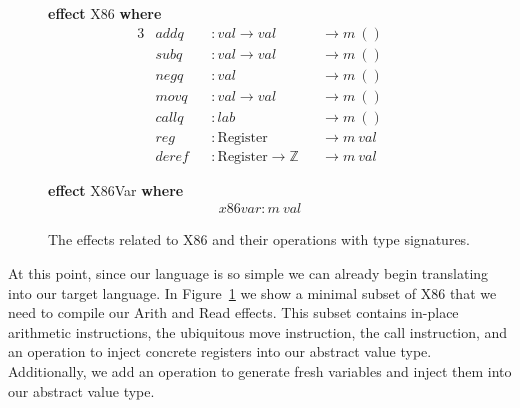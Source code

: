 \documentclass[a4paper,UKenglish,cleveref, autoref, thm-restate]{oasics-v2021}
\begin{document}
\begin{figure}[ht]
  \begin{minipage}[t]{0.4\textwidth}
  \textbf{effect} X86 \textbf{where}
  \vspace{-1em}
  \begin{alignat*}{3}
    & \mathit{addq}  && : \mathit{val} \to \mathit{val} && \to m~() \\
    & \mathit{subq}  && : \mathit{val} \to \mathit{val} && \to m~() \\
    & \mathit{negq}  && : \mathit{val}                  && \to m~() \\
    & \mathit{movq}  && : \mathit{val} \to \mathit{val} && \to m~() \\
    & \mathit{callq} && : \mathit{lab}                  && \to m~() \\
    & \mathit{reg}   && : \mathrm{Register}             && \to m~\mathit{val} \\
    & \mathit{deref} && : \mathrm{Register} \to \mathit{\mathbb{Z}} && \to m~\mathit{val}
  \end{alignat*}
  \end{minipage}
  \begin{minipage}[t]{0.4\textwidth}
  \textbf{effect} X86Var \textbf{where}
  \vspace{-1em}
  \begin{align*}
    \mathit{x86var} : m~\mathit{val}
  \end{align*}
  \end{minipage}
  \caption{The effects related to X86 and their operations with type signatures.}\label{fig:x86-ops}
\end{figure}

At this point, since our language is so simple we can already begin translating into our target language.
In Figure~\ref{fig:x86-ops} we show a minimal subset of X86 that we need to compile our Arith and Read effects.
This subset contains in-place arithmetic instructions, the ubiquitous move instruction, the call instruction, and an operation to inject concrete registers into our abstract value type.
Additionally, we add an operation to generate fresh variables and inject them into our abstract value type.
\end{document}
